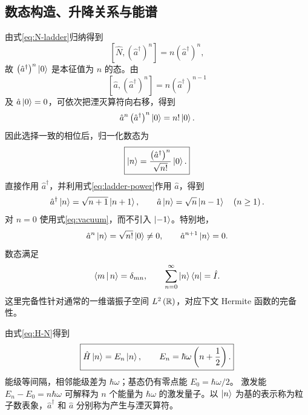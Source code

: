 \subsection{数态构造、升降关系与能谱}
由式\eqref{eq:N-ladder}归纳得到
\begin{equation}
\left[\hat N,\left(\hat a^\dagger\right)^n\right]=n\left(\hat a^\dagger\right)^n,
\end{equation}
故 $\left(\hat a^\dagger\right)^n\Ket{0}$ 是本征值为 $n$ 的态。由
\begin{equation}
\left[\hat a,\left(\hat a^\dagger\right)^n\right]=n\left(\hat a^\dagger\right)^{n-1}
\label{eq:ladder-power}
\end{equation}
及 $\hat a\Ket{0}=0$，可依次把湮灭算符向右移，得到
\begin{equation}
\hat a^n\left(\hat a^\dagger\right)^n\Ket{0}=n!\Ket{0}.
\end{equation}
因此选择一致的相位后，归一化数态为
\begin{equation}
\boxed{\Ket{n}=\frac{\left(\hat a^\dagger\right)^n}{\sqrt{n!}}\Ket{0}.}
\label{eq:number-state}
\end{equation}
直接作用 $\hat a^\dagger$，并利用式\eqref{eq:ladder-power}作用 $\hat a$，得到
\begin{equation}
\hat a^\dagger\Ket{n}=\sqrt{n+1}\Ket{n+1},\qquad
\hat a\Ket{n}=\sqrt n\Ket{n-1}\quad\left(n\geq1\right).
\end{equation}
对 $n=0$ 使用式\eqref{eq:vacuum}，而不引入 $\Ket{-1}$。特别地，
\begin{equation}
\hat a^n\Ket{n}=\sqrt{n!}\Ket{0}\neq0,\qquad
\hat a^{n+1}\Ket{n}=0.
\end{equation}
数态满足
\begin{equation}
\Braket{m|n}=\delta_{mn},\qquad
\sum_{n=0}^{\infty}\Ket{n}\Bra{n}=\hat I.
\end{equation}
这里完备性针对通常的一维谐振子空间 $L^2\left(\mathbb{R}\right)$，对应下文 Hermite 函数的完备性。

由式\eqref{eq:H-N}得到
\begin{equation}
\boxed{\hat H\Ket{n}=E_n\Ket{n},\qquad
E_n=\hbar\omega\left(n+\frac12\right).}
\end{equation}
能级等间隔，相邻能级差为 $\hbar\omega$；基态仍有零点能 $E_0=\hbar\omega/2$。
激发能 $E_n-E_0=n\hbar\omega$ 可解释为 $n$ 个能量为 $\hbar\omega$ 的激发量子。以 $\Ket{n}$ 为基的表示称为粒子数表象，$\hat a^\dagger$ 和 $\hat a$ 分别称为产生与湮灭算符。

